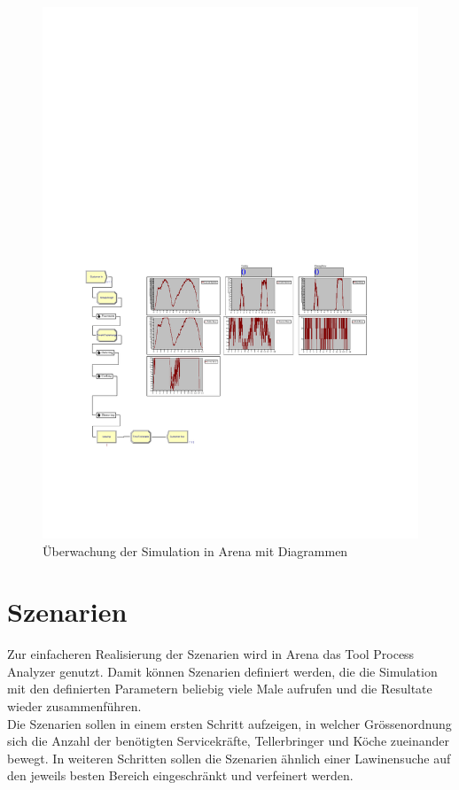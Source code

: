 \documentclass[ngerman,a4paper,12pt]{scrreprt}
\begin{document}
		\begin{figure}[H]
			\centering
				\includegraphics[trim=5.5cm 7.5cm 2.5cm 15cm, clip=true,width=\textwidth]{img/Model11a.pdf}
				\caption[Diagramme in Arena]{Überwachung der Simulation in Arena mit Diagrammen}
				\label{arenaDiagramme}
		\end{figure}	
			
			
	\section{Szenarien}
		Zur einfacheren Realisierung der Szenarien wird in Arena das Tool Process Analyzer genutzt. Damit können Szenarien definiert werden, die die Simulation mit den definierten Parametern beliebig viele Male aufrufen und die Resultate wieder zusammenführen. \\
		
		Die Szenarien sollen in einem ersten Schritt aufzeigen, in welcher Grössenordnung sich die Anzahl der benötigten Servicekräfte, Tellerbringer und Köche zueinander bewegt. In weiteren Schritten sollen die Szenarien ähnlich einer Lawinensuche auf den jeweils besten Bereich eingeschränkt und verfeinert werden.
			
\end{document}
